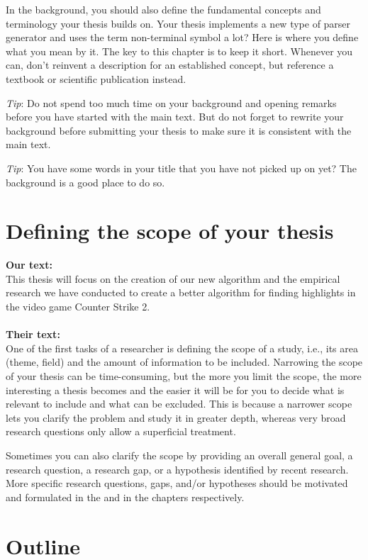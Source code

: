 \documentclass[a4paper,twoside]{bth}
\begin{document}
In the background, you should also define the fundamental concepts and terminology your thesis builds on. Your thesis implements a new type of parser generator and uses the term non-terminal symbol a lot? Here is where you define what you mean by it. The key to this chapter is to keep it short. Whenever you can, don't reinvent a description for an established concept, but reference a textbook or scientific publication instead.
    
\emph{Tip}: Do not spend too much time on your background and opening remarks before you have started with the main text. But do not forget to rewrite your background before submitting your thesis to make sure it is consistent with the main text.

\emph{Tip}: You have some words in your title that you have not picked up on yet? The background is a good place to do so.


\section{Defining the scope of your thesis}
\textbf{Our text:}\\
This thesis will focus on the creation of our new algorithm and the empirical research we have conducted to create a better algorithm for finding highlights in the video game Counter Strike 2. 
\\\\

\textbf{Their text:}\\
One of the first tasks of a researcher is defining the scope of a study, i.e., its area (theme, field) and the amount of information to be included. Narrowing the scope of your thesis can be time-consuming, but the more you limit the scope, the more interesting a thesis becomes and the easier it will be for you to decide what is relevant to include and what can be excluded. This is because a narrower scope lets you clarify the problem and study it in greater depth, whereas very broad research questions only allow a superficial treatment.

Sometimes you can also clarify the scope by providing an overall general goal, a research question, a research gap, or a hypothesis identified by recent research. More specific research questions, gaps, and/or hypotheses should be motivated and formulated in the  and in the  chapters respectively.


\section{Outline}
\end{document}
